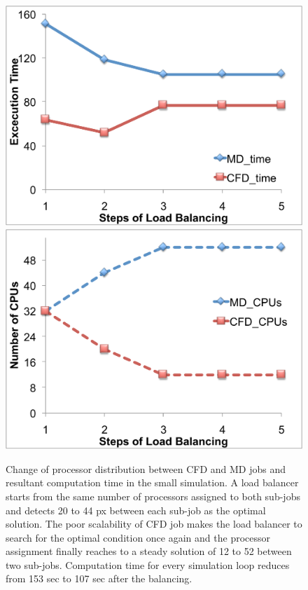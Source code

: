 \documentclass[conference,final]{IEEEtran}
\begin{document}
\begin{figure}
\centering
\includegraphics[scale=0.3]{fig6_1.pdf}
\linebreak
\includegraphics[scale=0.3]{fig6_2.pdf}
\caption{\small Change of processor distribution between CFD and MD
  jobs and resultant computation time in the small simulation. A load
  balancer starts from the same number of processors assigned to both
  sub-jobs and detects 20 to 44 px between each sub-job as the optimal
  solution. The poor scalability of CFD job makes the load balancer to
  search for the optimal condition once again and the processor
  assignment finally reaches to a steady solution of 12 to 52 between
  two sub-jobs. Computation time for every simulation loop reduces
  from 153 sec to 107 sec after the balancing.}
\label{Fig:LBSmall}
\vspace{-1em}
\end{figure}
\end{document}
